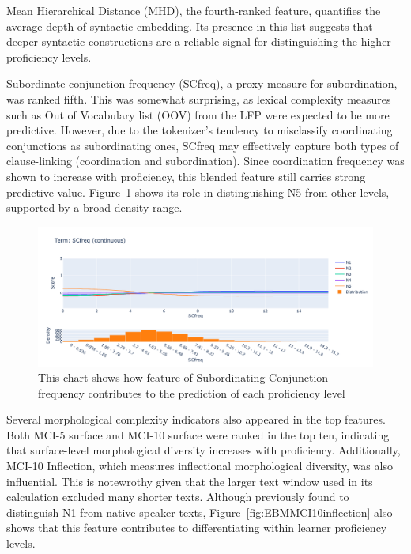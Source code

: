 Mean Hierarchical Distance (MHD), the fourth-ranked feature, quantifies the average depth of syntactic embedding.
Its presence in this list suggests that deeper syntactic constructions are a reliable signal for distinguishing the
higher proficiency levels.

Subordinate conjunction frequency (SCfreq), a proxy measure for subordination, was ranked fifth. This was somewhat
surprising, as lexical complexity measures such as Out of Vocabulary list (OOV) from the LFP were expected to be
more
predictive.
However,
due to the
tokenizer's tendency to misclassify coordinating conjunctions as subordinating ones, SCfreq may effectively capture
both types of clause-linking (coordination and subordination). Since coordination frequency was shown to increase
with proficiency, this blended feature still carries strong predictive value. Figure~\ref{fig:EBMSCfreq} shows its
role in distinguishing N5 from other levels, supported by a broad density range.

\begin{figure}[h!]
    \centering
    \includegraphics[scale=.4]{img/EBM/EBMSCfreq}
    \caption[Contribution of Subordinating Conjuction Frequency]{This chart shows how feature of Subordinating Conjunction frequency contributes to the prediction of each proficiency level}
    \label{fig:EBMSCfreq}
\end{figure}

Several morphological complexity indicators also appeared in the top features. Both MCI-5 surface and MCI-10
surface were ranked in the top ten, indicating that surface-level morphological diversity increases with
proficiency. Additionally, MCI-10 Inflection, which measures inflectional morphological diversity, was also
influential. This is notewrothy given that the larger text window used in its calculation excluded many shorter
texts. Although previously found to distinguish N1 from native speaker texts, Figure~\ref{fig:EBMMCI10inflection}
also shows that this feature contributes to differentiating within learner proficiency levels.

